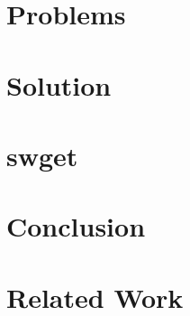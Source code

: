 \section{Problems}
\label{sec:problems-saber}



\section{Solution}
\label{sec:saber-saber}



\section{swget}
\label{sec:swget-saber}

\section{Conclusion}
\label{sec:conclusion-saber}

\section{Related Work}
\label{sec:related-saber}
